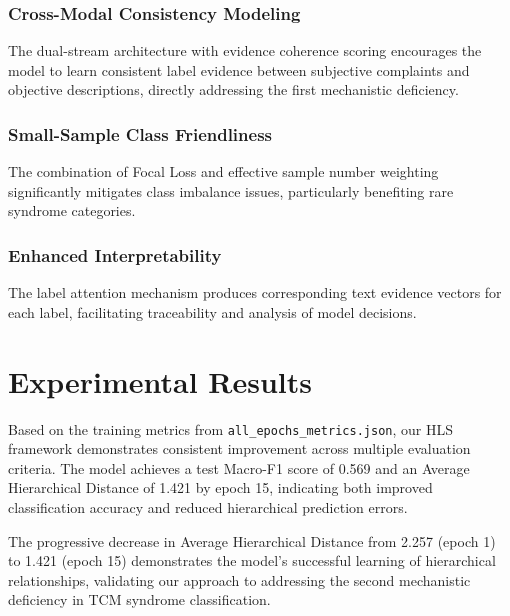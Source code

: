 \documentclass{article}
\begin{document}
\subsubsection{Cross-Modal Consistency Modeling}

The dual-stream architecture with evidence coherence scoring encourages the model to learn consistent label evidence between subjective complaints and objective descriptions, directly addressing the first mechanistic deficiency.

\subsubsection{Small-Sample Class Friendliness}

The combination of Focal Loss and effective sample number weighting significantly mitigates class imbalance issues, particularly benefiting rare syndrome categories.

\subsubsection{Enhanced Interpretability}

The label attention mechanism produces corresponding text evidence vectors for each label, facilitating traceability and analysis of model decisions.

\section{Experimental Results}

Based on the training metrics from \texttt{all\_epochs\_metrics.json}, our HLS framework demonstrates consistent improvement across multiple evaluation criteria. The model achieves a test Macro-F1 score of 0.569 and an Average Hierarchical Distance of 1.421 by epoch 15, indicating both improved classification accuracy and reduced hierarchical prediction errors.

The progressive decrease in Average Hierarchical Distance from 2.257 (epoch 1) to 1.421 (epoch 15) demonstrates the model's successful learning of hierarchical relationships, validating our approach to addressing the second mechanistic deficiency in TCM syndrome classification.
\end{document}
